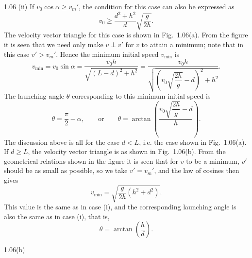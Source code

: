 \begin{solution}{1.06}
(ii) If $v_0\cos\alpha\geq v_m'$, the condition for this case can also be expressed as
\[
v_0\geq\frac{d^2+h^2}{d}\sqrt{\frac{g}{2h}}.
\]
The velocity vector triangle for this case is shown in Fig.~1.06(a). From the figure it is seen that we need only make $v\perp v'$ for $v$ to attain a minimum; note that in this case $v'>v_m'$. Hence the minimum initial speed $v_{\min}$ is
\[
v_{\min}=v_0\sin\alpha=\frac{v_0h}{\sqrt{(L-d)^2+h^2}}
=\frac{v_0h}{\sqrt{\left(v_0\sqrt{\dfrac{2h}{g}}-d\right)^2+h^2}}.
\]
The launching angle $\theta$ corresponding to this minimum initial speed is
\[
\theta=\frac{\pi}{2}-\alpha,\qquad\text{or}\qquad
\theta=\arctan\left(\frac{v_0\sqrt{\dfrac{2h}{g}}-d}{h}\right).
\]
The discussion above is all for the case $d<L$, i.e. the case shown in Fig.~1.06(a). If $d\geq L$, the velocity vector triangle is as shown in Fig.~1.06(b). From the geometrical relations shown in the figure it is seen that for $v$ to be a minimum, $v'$ should be as small as possible, so we take $v'=v_m'$, and the law of cosines then gives
\[
v_{\min}=\sqrt{\frac{g}{2h}(h^2+d^2)}.
\]
This value is the same as in case (i), and the corresponding launching angle is also the same as in case (i), that is,
\[
\theta=\arctan\left(\frac{h}{d}\right).
\]

\begin{figbox}{1.06(b)}
\end{figbox}
\end{solution}

